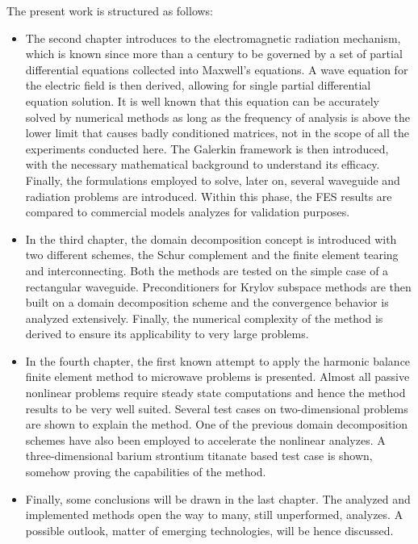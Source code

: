 The present work is structured as follows:
\begin{itemize}
\item The second chapter introduces to the electromagnetic radiation mechanism, which is known since more than a century to be governed by a set of partial differential equations collected into Maxwell's equations. A wave equation for the electric field is then derived, allowing for single partial differential equation solution. It is well known that this equation can be accurately solved by numerical methods as long as the frequency of analysis is above the lower limit that causes badly conditioned matrices, not in the scope of all the experiments conducted here. The Galerkin framework is then introduced, with the necessary mathematical background to understand its efficacy. Finally, the formulations employed to solve, later on, several waveguide and radiation problems are introduced. Within this phase, the FES results are compared to commercial models analyzes for validation purposes.
\item In the third chapter, the domain decomposition concept is introduced with two different schemes, the Schur complement and the finite element tearing and interconnecting. Both the methods are tested on the simple case of a rectangular waveguide. Preconditioners for Krylov subspace methods are then built on a domain decomposition scheme and the convergence behavior is analyzed extensively. Finally, the numerical complexity of the method is derived to ensure its applicability to very large problems.
\item In the fourth chapter, the first known attempt to apply the harmonic balance finite element method to microwave problems is presented. Almost all passive nonlinear problems require steady state computations and hence the method results to be very well suited. Several test cases on two-dimensional problems are shown to explain the method. One of the previous domain decomposition schemes have also been employed to accelerate the nonlinear analyzes. A three-dimensional barium strontium titanate based test case is shown, somehow proving the capabilities of the method.
\item Finally, some conclusions will be drawn in the last chapter. The analyzed and implemented methods open the way to many, still unperformed, analyzes. A possible outlook, matter of emerging technologies, will be hence discussed.
\end{itemize}

